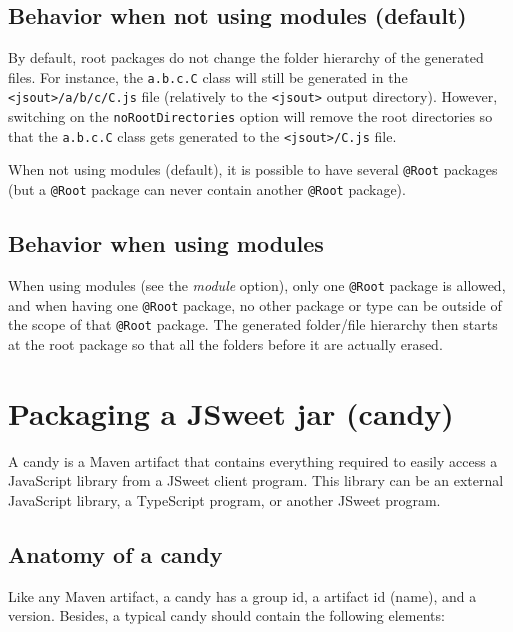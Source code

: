 \documentclass[a4paper]{report}
\begin{document}
\subsection{Behavior when not using modules (default)}

By default, root packages do not change the folder hierarchy of the generated files. For instance, the \texttt{a.b.c.C} class will still be generated in the \texttt{<jsout>/a/b/c/C.js} file (relatively to the \texttt{<jsout>} output directory). However, switching on the \texttt{noRootDirectories} option will remove the root directories so that the \texttt{a.b.c.C} class gets generated to the \texttt{<jsout>/C.js} file.

When not using modules (default), it is possible to have several \texttt{@Root} packages (but a \texttt{@Root} package can never contain another \texttt{@Root} package).

\subsection{Behavior when using modules}

When using modules (see the \emph{module} option), only one \texttt{@Root} package is allowed, and when having one \texttt{@Root} package, no other package or type can be outside of the scope of that \texttt{@Root} package. The generated folder/file hierarchy then starts at the root package so that all the folders before it are actually erased.

\section{Packaging a JSweet jar (candy)}

A candy is a Maven artifact that contains everything required to easily access a JavaScript library from a JSweet client program. This library can be an external JavaScript library, a TypeScript program, or another JSweet program.   

\subsection{Anatomy of a candy}

Like any Maven artifact, a candy has a group id, a artifact id (name), and a version. Besides, a typical candy should contain the following elements:
\end{document}
